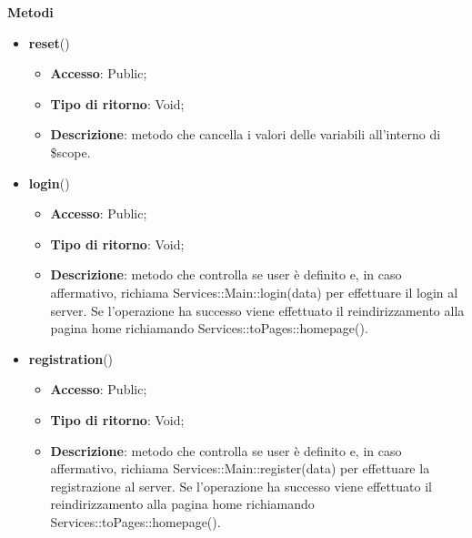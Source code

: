 {{\begin{itemize}
\begin{itemize}
		\end{itemize}
    \end{itemize}
	\textbf{Metodi}
	\begin{itemize}
		\item \textbf{reset}()
		\begin{itemize}
			\item \textbf{Accesso}: Public;
			\item \textbf{Tipo di ritorno}: Void;
			\item \textbf{Descrizione}: metodo che cancella i valori delle variabili all'interno di \$scope.
		\end{itemize}
		\item \textbf{login}()
		\begin{itemize}
			\item \textbf{Accesso}: Public;
			\item \textbf{Tipo di ritorno}: Void;
			\item \textbf{Descrizione}: metodo che controlla se user è definito e, in caso affermativo, richiama Services::\-Main::\-login(data) per effettuare il login al server. Se l'operazione ha successo viene effettuato il reindirizzamento alla pagina home richiamando Services::\-toPages::\-homepage().
		\end{itemize}
        \item \textbf{registration}()
		\begin{itemize}
			\item \textbf{Accesso}: Public;
			\item \textbf{Tipo di ritorno}: Void;
			\item \textbf{Descrizione}: metodo che controlla se user è definito e, in caso affermativo, richiama Services::\-Main::\-register(data) per effettuare la registrazione al server. Se l'operazione ha successo viene effettuato il reindirizzamento alla pagina home richiamando Services::\-toPages::\-homepage().
		\end{itemize}
	\end{itemize}
}
}

